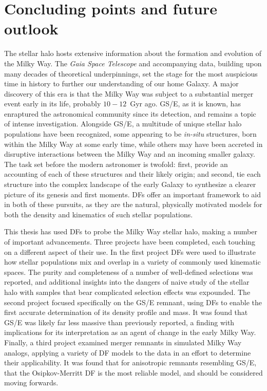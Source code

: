\section{Concluding points and future outlook}

The stellar halo hosts extensive information about the formation and evolution of the Milky Way. The \textit{Gaia Space Telescope} and accompanying data, building upon many decades of theoretical underpinnings, set the stage for the most auspicious time in history to further our understanding of our home Galaxy. A major discovery of this era is that the Milky Way was subject to a substantial merger event early in its life, probably $10-12$~Gyr ago. GS/E, as it is known, has enraptured the astronomical community since its detection, and remains a topic of intense investigation. Alongside GS/E, a multitude of unique stellar halo populations have been recognized, some appearing to be \textit{in-situ} structures, born within the Milky Way at some early time, while others may have been accreted in disruptive interactions between the Milky Way and an incoming smaller galaxy. The task set before the modern astronomer is twofold: first, provide an accounting of each of these structures and their likely origin; and second, tie each structure into the complex landscape of the early Galaxy to synthesize a clearer picture of its genesis and first moments. DFs offer an important framework to aid in both of these pursuits, as they are the natural, physically motivated models for both the density and kinematics of such stellar populations.

This thesis has used DFs to probe the Milky Way stellar halo, making a number of important advancements. Three projects have been completed, each touching on a different aspect of their use. In the first project DFs were used to illustrate how stellar populations mix and overlap in a variety of commonly used kinematic spaces. The purity and completeness of a number of well-defined selections was reported, and additional insights into the dangers of naive study of the stellar halo with samples that bear complicated selection effects was expounded. The second project focused specifically on the GS/E remnant, using DFs to enable the first accurate determination of its density profile and mass. It was found that GS/E was likely far less massive than previously reported, a finding with implications for its interpretation as an agent of change in the early Milky Way. Finally, a third project examined merger remnants in simulated Milky Way analogs, applying a variety of DF models to the data in an effort to determine their applicability. It was found that for anisotropic remnants resembling GS/E, that the Osipkov-Merritt DF is the most reliable model, and should be considered moving forwards.

